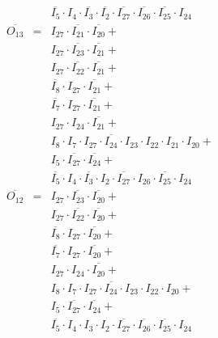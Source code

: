 \documentclass[a4paper,russian]{report}
\begin{document}
\begin{eqnarray*}
	& &  \overline{I_{5}} \cdotp I_{4} \cdotp \overline{I_{3}} \cdotp \overline{I_{2}} \cdotp \overline{I_{27}} \cdotp \overline{I_{26}} \cdotp \overline{I_{25}} \cdotp I_{24} \\
    \overline{O_{13}} & = & I_{27} \cdotp \overline{I_{21}} \cdotp \overline{I_{20}} + \\
	& &  I_{27} \cdotp \overline{I_{23}} \cdotp \overline{I_{21}} + \\
	& &  I_{27} \cdotp \overline{I_{22}} \cdotp \overline{I_{21}} + \\
	& &  \overline{I_{8}} \cdotp I_{27} \cdotp \overline{I_{21}} + \\
	& &  \overline{I_{7}} \cdotp I_{27} \cdotp \overline{I_{21}} + \\
	& &  I_{27} \cdotp I_{24} \cdotp \overline{I_{21}} + \\
	& &  I_{8} \cdotp I_{7} \cdotp I_{27} \cdotp \overline{I_{24}} \cdotp I_{23} \cdotp I_{22} \cdotp I_{21} \cdotp I_{20} + \\
	& &  I_{5} \cdotp \overline{I_{27}} \cdotp \overline{I_{24}} + \\
	& &  \overline{I_{5}} \cdotp I_{4} \cdotp \overline{I_{3}} \cdotp I_{2} \cdotp \overline{I_{27}} \cdotp I_{26} \cdotp \overline{I_{25}} \cdotp I_{24} \\
    \overline{O_{12}} & = & I_{27} \cdotp \overline{I_{23}} \cdotp \overline{I_{20}} + \\
	& &  I_{27} \cdotp \overline{I_{22}} \cdotp \overline{I_{20}} + \\
	& &  \overline{I_{8}} \cdotp I_{27} \cdotp \overline{I_{20}} + \\
	& &  \overline{I_{7}} \cdotp I_{27} \cdotp \overline{I_{20}} + \\
	& &  I_{27} \cdotp I_{24} \cdotp \overline{I_{20}} + \\
	& &  I_{8} \cdotp I_{7} \cdotp I_{27} \cdotp \overline{I_{24}} \cdotp I_{23} \cdotp I_{22} \cdotp I_{20} + \\
	& &  I_{5} \cdotp \overline{I_{27}} \cdotp \overline{I_{24}} + \\
	& &  \overline{I_{5}} \cdotp I_{4} \cdotp I_{3} \cdotp I_{2} \cdotp \overline{I_{27}} \cdotp \overline{I_{26}} \cdotp \overline{I_{25}} \cdotp I_{24} \\
 \end{eqnarray*}
\end{document}
